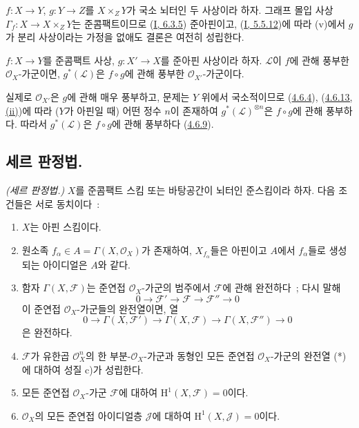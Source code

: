 \begin{remark}[5.1.11]
\label{II.5.1.11-ko}
$f:X\to Y$, $g:Y\to Z$를 $X\times_ZY$가 국소 뇌터인 두 사상이라
하자. 그래프 몰입 사상 $\Gamma_f:X\to X\times_ZY$는 준콤팩트이므로
(\hyperref[I.6.3.5-ko]{I, 6.3.5}) 준아핀이고,
(\hyperref[I.5.5.12-ko]{I, 5.5.12})에 따라 (v)에서 $g$가 분리
사상이라는 가정을 없애도 결론은 여전히 성립한다.
\end{remark}

\begin{proposition}[5.1.12]
\label{II.5.1.12-ko}
$f:X\to Y$를 준콤팩트 사상, $g:X'\to X$를 준아핀 사상이라 하자.
$\mathcal{L}$이 $f$에 관해 풍부한 $\mathcal{O}_X$-가군이면,
$g^*(\mathcal{L})$은 $f\circ g$에 관해 풍부한
$\mathcal{O}_{X'}$-가군이다.
\end{proposition}

실제로 $\mathcal{O}_{X'}$은 $g$에 관해 매우 풍부하고, 문제는 $Y$
위에서 국소적이므로 (\hyperref[II.4.6.4-ko]{4.6.4}),
(\hyperref[II.4.6.13-ko]{4.6.13, (ii)})에 따라 ($Y$가 아핀일 때)
어떤 정수 $n$이 존재하여 $g^*(\mathcal{L})^{\otimes n}$은
$f\circ g$에 관해 풍부하다. 따라서
$g^*(\mathcal{L})$은 $f\circ g$에 관해 풍부하다
(\hyperref[II.4.6.9-ko]{4.6.9}).


\subsection{세르 판정법.}
\label{subsection:II.5.2-ko}

\begin{theorem}[5.2.1]
\label{II.5.2.1-ko}
\emph{(세르 판정법.)} $X$를 준콤팩트 스킴 또는 바탕공간이 뇌터인
준스킴이라 하자. 다음 조건들은 서로 동치이다~:
\begin{enumerate}
  \item[\rm{a)}] $X$는 아핀 스킴이다.
  \item[\rm{b)}] 원소족
  $f_\alpha\in A=\Gamma(X,\mathcal{O}_X)$가 존재하여, $X_{f_\alpha}$들은
  아핀이고 $A$에서 $f_\alpha$들로 생성되는 아이디얼은 $A$와 같다.
  \item[\rm{c)}] 함자 $\Gamma(X,\mathcal{F})$는 준연접
  $\mathcal{O}_X$-가군의 범주에서 $\mathcal{F}$에 관해 완전하다~; 다시
  말해
  \[
    0\to\mathcal{F}'\to\mathcal{F}\to\mathcal{F}''\to0 \tag{*}
  \]
  이 준연접 $\mathcal{O}_X$-가군들의 완전열이면, 열
  \[
    0\to\Gamma(X,\mathcal{F}')\to\Gamma(X,\mathcal{F})
      \to\Gamma(X,\mathcal{F}'')\to0
  \]
  은 완전하다.
  \item[\rm{c')}] $\mathcal{F}$가 유한곱 $\mathcal{O}_X^n$의 한
  부분-$\mathcal{O}_X$-가군과 동형인 모든 준연접
  $\mathcal{O}_X$-가군의 완전열 (*)에 대하여 성질 c)가 성립한다.
  \item[\rm{d)}] 모든 준연접 $\mathcal{O}_X$-가군 $\mathcal{F}$에
  대하여 $\mathrm{H}^1(X,\mathcal{F})=0$이다.
  \item[\rm{d')}] $\mathcal{O}_X$의 모든 준연접 아이디얼층
  $\mathcal{J}$에 대하여 $\mathrm{H}^1(X,\mathcal{J})=0$이다.
\end{enumerate}
\end{theorem}

